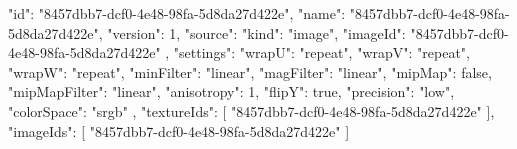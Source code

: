 {
  "id": "8457dbb7-dcf0-4e48-98fa-5d8da27d422e",
  "name": "8457dbb7-dcf0-4e48-98fa-5d8da27d422e",
  "version": 1,
  "source": {
    "kind": "image",
    "imageId": "8457dbb7-dcf0-4e48-98fa-5d8da27d422e"
  },
  "settings": {
    "wrapU": "repeat",
    "wrapV": "repeat",
    "wrapW": "repeat",
    "minFilter": "linear",
    "magFilter": "linear",
    "mipMap": false,
    "mipMapFilter": "linear",
    "anisotropy": 1,
    "flipY": true,
    "precision": "low",
    "colorSpace": "srgb"
  },
  "textureIds": [
    "8457dbb7-dcf0-4e48-98fa-5d8da27d422e"
  ],
  "imageIds": [
    "8457dbb7-dcf0-4e48-98fa-5d8da27d422e"
  ]
}
